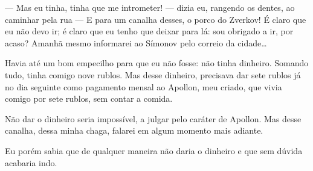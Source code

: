 --- Mas eu tinha, tinha que me intrometer! --- dizia eu, rangendo os dentes,
ao caminhar pela rua --- E para um canalha desses, o porco do Zverkov! É
claro que eu não devo ir; é claro que eu tenho que deixar para lá: sou
obrigado a ir, por acaso? Amanhã mesmo informarei ao Símonov pelo
correio da cidade\ldots{}


Havia até um bom empecilho para que eu não fosse: não tinha dinheiro.
Somando tudo, tinha comigo nove rublos. Mas desse dinheiro, precisava
dar sete rublos já no dia seguinte como pagamento mensal ao Apollon,
meu criado, que vivia comigo por sete rublos, sem contar a comida.

Não dar o dinheiro seria impossível, a julgar pelo caráter de Apollon.
Mas desse canalha, dessa minha chaga, falarei em algum momento mais
adiante.

Eu porém sabia que de qualquer maneira não daria o dinheiro e que sem
dúvida acabaria indo.

